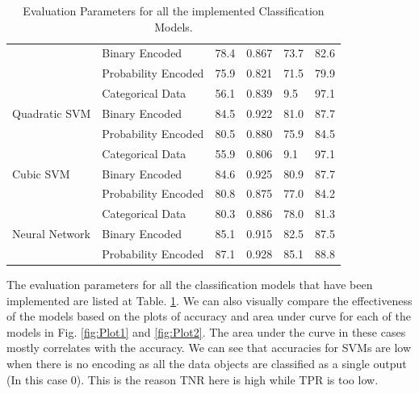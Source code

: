 \documentclass{article} %
\begin{document}
\begin{table}[H]
{\begin{tabular}{|l|l|l|l|l|l|}
			& Binary Encoded                                             & 78.4             & 0.867            & 73.7        & 82.6       \\ \cline{2-6} 
			& Probability Encoded                                        & 75.9             & 0.821            & 71.5        & 79.9       \\ \hline
			\multirow{3}{*}{Quadratic SVM}                                   & Categorical Data                                           & 56.1             & 0.839            & 9.5         & 97.1       \\ \cline{2-6} 
			& Binary Encoded                                             & 84.5             & 0.922            & 81.0        & 87.7       \\ \cline{2-6} 
			& Probability Encoded                                        & 80.5             & 0.880            & 75.9        & 84.5       \\ \hline
			\multirow{3}{*}{Cubic SVM}                                       & Categorical Data                                           & 55.9             & 0.806            & 9.1         & 97.1       \\ \cline{2-6} 
			& Binary Encoded                                             & 84.6             & 0.925            & 80.9        & 87.7       \\ \cline{2-6} 
			& Probability Encoded                                        & 80.8             & 0.875            & 77.0        & 84.2       \\ \hline
			\multirow{3}{*}{Neural Network}                                  & Categorical Data                                           & 80.3             & 0.886            & 78.0        & 81.3       \\ \cline{2-6} 
			& Binary Encoded                                             & 85.1             & 0.915            & 82.5        & 87.5       \\ \cline{2-6} 
			& Probability Encoded                                        & 87.1             & 0.928            & 85.1        & 88.8       \\ \hline
		\end{tabular}
	}
	\caption{Evaluation Parameters for all the implemented Classification Models.}
	\label{table:Table1}
\end{table}
	
	The evaluation parameters for all the classification models that have been implemented are listed at Table. \ref{table:Table1}. We can also visually compare the effectiveness of the models based on the plots of accuracy and area under curve for each of the models in  Fig. \ref{fig:Plot1} and \ref{fig:Plot2}. The area under the curve in these cases mostly correlates with the accuracy. We can see that accuracies for SVMs are low when there is no encoding as all the data objects are classified as a single output (In this case 0). This is the reason TNR here is high while TPR is too low. 	
	
\end{document}
